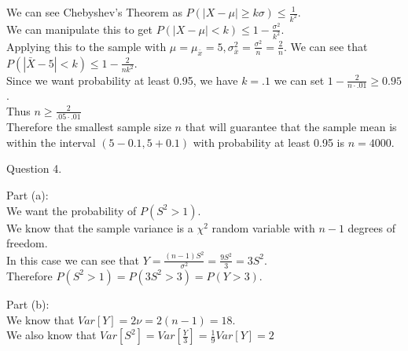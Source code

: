 \documentclass[answers,12pt,addpoints]{exam}
\begin{document}
\begin{questions}
    \begin{solution}
        We can see Chebyshev's Theorem as $P(|X - \mu| \geq k\sigma) \leq \frac{1}{k^2}$. \\
        We can manipulate this to get $P(|X - \mu| < k) \leq 1 - \frac{\sigma^2}{k^2}$.\\
        Applying this to the sample with $\mu = \mu_{\bar{x}} =  5, \sigma_{\bar{x}}^2 = \frac{\sigma^2}{n} = \frac{2}{n}$. We can see that $P(|\bar{X} - 5| < k) \leq 1 - \frac{2}{nk^2}$.\\
        Since we want probability at least 0.95, we have $k=.1$ we can set $1 - \frac{2}{n \cdot .01} \geq 0.95$.\\
        Thus $n \geq \frac{2}{.05 \cdot .01}$\\
        Therefore the smallest sample size $n$ that will guarantee that the sample mean is within the interval $(5 - 0.1, 5 + 0.1)$ with probability at least 0.95 is $n = 4000$.\\
    \end{solution}
    

    \question Question 4.
    \begin{solution}
        Part (a):\\
        We want the probability of $P(S^2 > 1)$. \\
        We know that the sample variance is a $\chi^2$ random variable with $n-1$ degrees of freedom. \\
        In this case we can see that $Y = \frac{(n-1)S^2}{\sigma^2} = \frac{9S^2}{3} = 3S^2$.\\
        Therefore $P(S^2 > 1) = P(3S^2 > 3) = P(Y > 3)$.\\
    \end{solution}
    \begin{solution}
        Part (b):\\
        We know that $Var[Y] = 2\nu = 2(n-1) = 18$.\\
        We also know that $Var[S^2] = Var[\frac{Y}{3}] = \frac{1}{9}Var[Y] = 2$
    \end{solution}


\end{questions}
\end{document}
